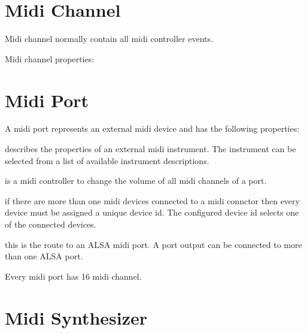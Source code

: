       \blank[big]

  \section{Midi Channel}
      Midi channel normally contain all midi controller events.

      Midi channel properties:

      \blank[big]

      \blank[big]

  \section{Midi Port}

       A midi port represents an external midi device
      and has the following properties:

      \blank[big]
        describes the properties
        of an external midi instrument. The instrument can be
        selected from a list of available instrument descriptions.

        is a midi
        controller to change the volume of all midi channels of a port.

        if there are more than
      one midi devices connected to a midi connctor then every device
      must be assigned a unique device id. 
      The configured device id selects one of the connected devices.

       this is the route to an ALSA midi port.
        A port output can be connected to more than one ALSA port.

      \blank[big]

      Every midi port has 16 midi channel.

  \section{Midi Synthesizer}

